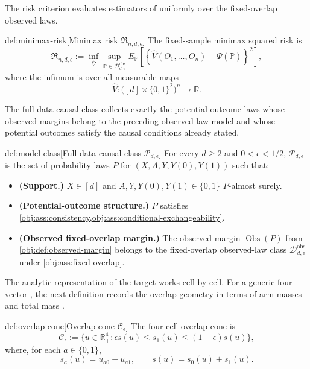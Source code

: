 \documentclass[11pt]{article}
\begin{document}
The risk criterion evaluates estimators of  uniformly over the fixed-overlap observed laws.

\begin{definitionv}{def:minimax-risk}[Minimax risk \(\mathfrak R_{n,d,\epsilon}\)]
The fixed-sample minimax squared risk is
\[
\mathfrak R_{n,d,\epsilon}
:=
\inf_{\widehat V}
\sup_{\mathbb P\in\mathcal D_{d,\epsilon}^{\mathrm{obs}}}
E_{\mathbb P}
\left[
\left\{
\widehat V(O_1,\ldots,O_n)-\Psi(\mathbb P)
\right\}^2
\right],
\]
where the infimum is over all measurable maps
\[
\widehat V:\bigl([d]\times\{0,1\}^2\bigr)^n\to\mathbb R.
\]
\end{definitionv}

The full-data causal class collects exactly the potential-outcome laws whose observed margins belong to the preceding observed-law model and whose potential outcomes satisfy the causal conditions already stated.

\begin{definitionv}{def:model-class}[Full-data causal class \(\mathcal P_{d,\epsilon}\)]
For every \(d\geq 2\) and \(0<\epsilon<1/2\), \(\mathcal P_{d,\epsilon}\) is the set of probability laws \(P\) for \((X,A,Y,Y(0),Y(1))\) such that:
\begin{itemize}
\item \textbf{(Support.)} \(X\in[d]\) and \(A,Y,Y(0),Y(1)\in\{0,1\}\) \(P\)-almost surely.
\item \textbf{(Potential-outcome structure.)} \(P\) satisfies \cref{obj:ass:consistency,obj:ass:conditional-exchangeability}.
\item \textbf{(Observed fixed-overlap margin.)} The observed margin \(\operatorname{Obs}(P)\) from \cref{obj:def:observed-margin} belongs to the fixed-overlap observed-law class \(\mathcal D_{d,\epsilon}^{\mathrm{obs}}\) under \cref{obj:ass:fixed-overlap}.
\end{itemize}
\end{definitionv}

The analytic representation of the target works cell by cell. For a generic four-vector , the next definition records the overlap geometry in terms of arm masses  and total mass .

\begin{definitionv}{def:overlap-cone}[Overlap cone \(\mathcal C_\epsilon\)]
The four-cell overlap cone is
\[
\mathcal C_\epsilon
:=
\{u\in\mathbb R_+^4:\epsilon s(u)\leq s_1(u)\leq(1-\epsilon)s(u)\},
\]
where, for each \(a\in\{0,1\}\),
\[
s_a(u)=u_{a0}+u_{a1},
\qquad
s(u)=s_0(u)+s_1(u).
\]
\end{definitionv}
\end{document}

